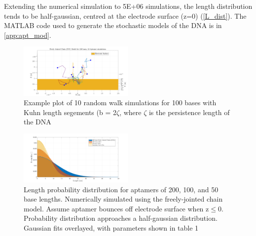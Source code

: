 Extending the numerical simulation to 5E+06 simulations, the length distribution tends to be half-gaussian, centred at the electrode surface (z=0) (\autoref{L_dist}). The MATLAB code used to generate the stochastic models of the DNA is in \autoref{app:apt_mod}.
\begin{figure}[H]
    \centering
    \includegraphics[width = 0.5\textwidth]{img/DNA_100_base_simulation_v1.png}
    \caption{Example plot of 10 random walk simulations for 100 bases with Kuhn length segements (b = 2$\zeta$, where $\zeta$ is the persistence length of the DNA}
    \label{Apt_sim}
\end{figure}
\begin{figure}[H]
    \centering
    \includegraphics[width = 0.5\textwidth]{img/length_with_gaussians.png}
    \caption{Length probability distribution for aptamers of 200, 100, and 50 base lengths. Numerically simulated using the freely-jointed chain model. Assume aptamer bounces off electrode surface when z$\leq$0. Probability distribution approaches a half-gaussian distribution. Gaussian fits overlayed, with parameters shown in table 1}
    \label{L_dist}
\end{figure}

